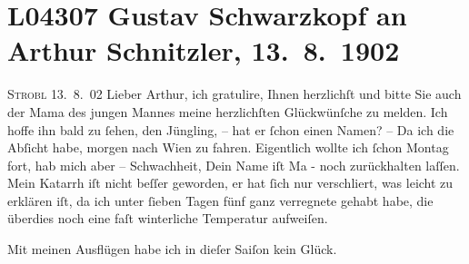 

\section[Gustav Schwarzkopf an Arthur Schnitzler, 13. 8. 1902]{L04307 Gustav Schwarzkopf an Arthur Schnitzler, 13. 8. 1902}
\nopagebreak{}
\rehead{ }\normalsize\beginnumbering{}
\toendnotes[C]{\smallbreak\pagebreak[2]}
\toendnotes[C]{\smallbreak}
\toendnotes[C]{\smallbreak}
\pstart
           \raggedleft{}{\pb}\textsc{Strobl}{ }13. 8. 02\pend
           \vspace{0.5em}
\pstart
           Lieber Arthur, ich gratulire, Ihnen herzlichſt und bitte Sie auch
               der Mama des jungen Mannes meine herzlichſten
               Glückwünſche zu melden. Ich hoffe ihn bald zu{ }ſehen, den Jüngling, – hat er{ }ſchon einen Namen? – Da
               ich die Abſicht habe, morgen nach Wien zu fahren. Eigentlich wollte ich{ }ſchon Montag fort, hab
               mich aber – Schwachheit, Dein Name iſt Ma{\geminationn} - noch
               zurückhalten laſſen. Mein Katarrh iſt nicht beſſer geworden, er hat{ }ſich {\pb}nur verschli{\geminationm}ert, was leicht zu erklären iſt, da ich unter{ }ſieben Tagen fünf ganz verregnete
               gehabt habe, die überdies noch eine faſt winterliche Temperatur aufweiſen.\pend
           
\pstart
           Mit meinen Ausflügen habe ich in dieſer Saiſon kein Glück.\pend
           
